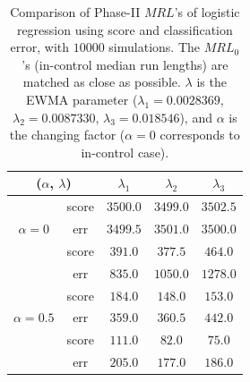 \documentclass[twoside,11pt]{article}
\begin{document}
\begin{table}[!t]
\centering
\begin{tabular}{ccccc}
\toprule
\multicolumn{2}{c}{($ \alpha$, $ \lambda$)} & {$  \lambda_1$} & {$ \lambda_2$} & {$ \lambda_3$} \\
\midrule
\multirow{3}{*}{$\alpha = 0$} & score &$3500.0$ & $3499.0$ & $3502.5$ \\
& err &$3499.5$ & $3501.0$ & $3500.0$ \\
\midrule
\multirow{3}{*}{$\alpha = 0.3$} & score &$\bm{391.0}$ & $\bm{377.5}$ & $\bm{464.0}$ \\
& err &$835.0$ & $1050.0$ & $1278.0$ \\
\midrule
\multirow{3}{*}{$\alpha = 0.5$} & score &$\bm{184.0}$ & $\bm{148.0}$ & $\bm{153.0}$ \\
& err &$359.0$ & $360.5$ & $442.0$ \\
\midrule
\multirow{3}{*}{$\alpha = 0.7$} & score &$\bm{111.0}$ & $\bm{82.0}$ & $\bm{75.0}$ \\
& err &$205.0$ & $177.0$ & $186.0$ \\
\midrule
\end{tabular}
\caption{Comparison of Phase-II $MRL$'s of logistic regression using score and classification error, with $10000$ simulations. The $MRL_0$'s (in-control median run lengths) are matched as close as possible. $ \lambda$ is the EWMA parameter ({$ \lambda_1 = 0.0028369$}, {$ \lambda_2 = 0.0087330$}, {$ \lambda_3 = 0.018546$}), and $ \alpha$ is the changing factor ($ \alpha=0$ corresponds to in-control case).}
\label{tab:logi_MRL}
\end{table}
\end{document}
